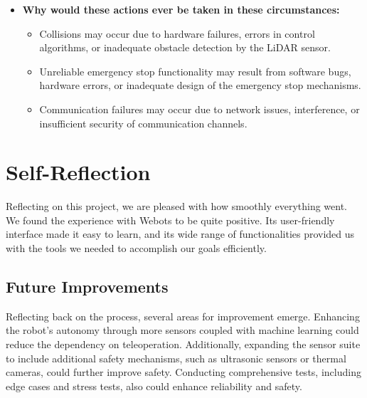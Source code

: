 \documentclass{article}
\begin{document}
\begin{itemize}[leftmargin=*]
    \item \textbf{Why would these actions ever be taken in these circumstances:}
    \begin{itemize}[label=--]
        \item Collisions may occur due to hardware failures, errors in control algorithms, or inadequate obstacle detection by the LiDAR sensor.
        \item Unreliable emergency stop functionality may result from software bugs, hardware errors, or inadequate design of the emergency stop mechanisms.
        \item Communication failures may occur due to network issues, interference, or insufficient security of communication channels.
    \end{itemize}
\end{itemize}

\section{Self-Reflection}
Reflecting on this project, we are pleased with how smoothly everything went. We found the experience with Webots to be quite positive. Its user-friendly interface made it easy to learn, and its wide range of functionalities provided us with the tools we needed to accomplish our goals efficiently.

\subsection{Future Improvements}
Reflecting back on the process, several areas for improvement emerge. Enhancing the robot's autonomy through more sensors coupled with machine learning could reduce the dependency on teleoperation. Additionally, expanding the sensor suite to include additional safety mechanisms, such as ultrasonic sensors or thermal cameras, could further improve safety. Conducting comprehensive tests, including edge cases and stress tests, also could enhance reliability and safety.
\end{document}
